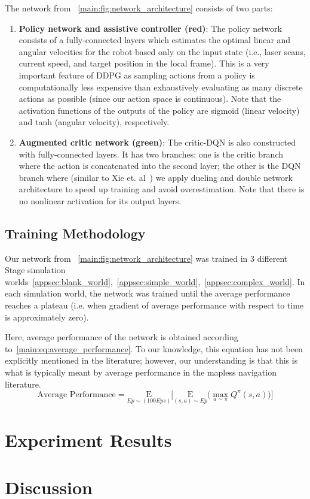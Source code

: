The network from ~\autoref{main:fig:network_architecture} consists of two parts:
\begin{enumerate}
\item \textbf{Policy network and assistive controller (red)}: The policy network consists of a fully-connected layers which estimates the optimal linear and angular velocities for the robot based only on the input state (i.e., laser scans, current speed, and target position in the local frame). This is a very important feature of DDPG as sampling actions from a policy is computationally less expensive than exhaustively evaluating as many discrete actions as possible (since our action space is continuous). Note that the activation functions of the outputs of the policy are sigmoid (linear velocity) and tanh (angular velocity), respectively. 
\item \textbf{Augmented critic network (green)}: The critic-DQN is also constructed with fully-connected layers. It has two branches: one is the critic branch where the action is concatenated into the second layer; the other is the DQN branch where (similar to Xie et. al~\cite{xie_learning_2018}) we apply dueling and double network architecture to speed up training and avoid overestimation. Note that there is no nonlinear activation for its output layers.
\end{enumerate}

\subsection{Training Methodology}
Our network from ~\autoref{main:fig:network_architecture} was trained in 3 different Stage simulation worlds~\ref{appsec:blank_world},~\ref{appsec:simple_world},~\ref{appsec:complex_world}. In each simulation world, the network was trained until the average performance reaches a plateau (i.e. when gradient of average performance with respect to time is approximately zero).

Here, average performance of the network is obtained according to~\autoref{main:eq:average_performance}. To our knowledge, this equation has not been explicitly mentioned in the literature; however, our understanding is that this is what is typically meant by average performance in the mapless navigation literature.
\begin{equation}
\text{Average Performance} = \underset{Ep \sim (100 Eps)}{\mathrm E}\bigg[\underset{(s, a) \sim Ep}{\mathrm E} \big(\underset{a \sim \pi}{\max} Q^{\pi}(s, a)\big)\bigg]
\label{main:eq:average_performance}
\end{equation}


\section{Experiment Results}



\section{Discussion}